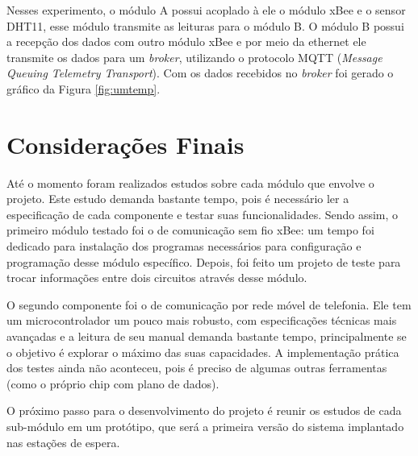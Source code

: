 \documentclass[12pt]{uftpibicsic2018}
\begin{document}
Nesses experimento, o módulo A possui acoplado à ele o módulo xBee e o sensor DHT11, esse módulo transmite as leituras para o módulo B. O módulo B possui a recepção dos dados com outro módulo xBee e por meio da ethernet ele transmite os dados para um \textit{broker}, utilizando o protocolo MQTT (\textit{Message Queuing Telemetry Transport}). Com os dados recebidos no \textit{broker} foi gerado o gráfico da Figura \ref{fig:umtemp}.

\chapter{Considerações Finais}\vskip -12pt

Até o momento foram realizados estudos sobre cada módulo que envolve o projeto. Este estudo demanda bastante tempo, pois é necessário ler a especificação de cada componente e testar suas funcionalidades. Sendo assim, o primeiro módulo testado foi o de comunicação sem fio xBee: um tempo foi dedicado para instalação dos programas necessários para configuração e programação desse módulo específico. Depois, foi feito um projeto de teste para trocar informações entre dois circuitos através desse módulo.

O segundo componente foi o de comunicação por rede móvel de telefonia. Ele tem um microcontrolador um pouco mais robusto, com especificações técnicas mais avançadas e a leitura de seu manual demanda bastante tempo, principalmente se o objetivo é explorar o máximo das suas capacidades. A implementação prática dos testes ainda não aconteceu, pois é preciso de algumas outras ferramentas (como o próprio chip com plano de dados).



O próximo passo para o desenvolvimento do projeto é reunir os estudos de cada sub-módulo em um protótipo, que será a primeira versão do sistema implantado nas estações de espera.

%

\end{document}
